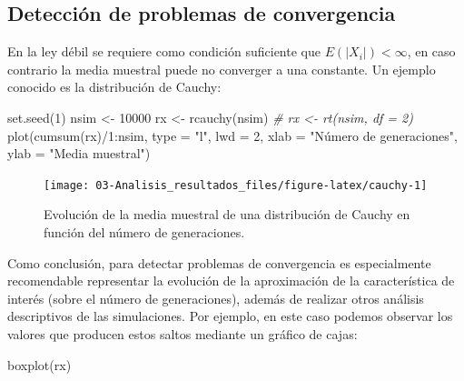 \documentclass[
]{book}
\newenvironment{Shaded}{\begin{snugshade}}{\end{snugshade}}
\newcommand{\AttributeTok}[1]{\textcolor[rgb]{0.77,0.63,0.00}{#1}}
\newcommand{\CommentTok}[1]{\textcolor[rgb]{0.56,0.35,0.01}{\textit{#1}}}
\newcommand{\DecValTok}[1]{\textcolor[rgb]{0.00,0.00,0.81}{#1}}
\newcommand{\FunctionTok}[1]{\textcolor[rgb]{0.00,0.00,0.00}{#1}}
\newcommand{\NormalTok}[1]{#1}
\newcommand{\OtherTok}[1]{\textcolor[rgb]{0.56,0.35,0.01}{#1}}
\newcommand{\SpecialCharTok}[1]{\textcolor[rgb]{0.00,0.00,0.00}{#1}}
\newcommand{\StringTok}[1]{\textcolor[rgb]{0.31,0.60,0.02}{#1}}
\theoremstyle{break}
\theoremstyle{nonumberplain}
\begin{document}
\hypertarget{detecciuxf3n-de-problemas-de-convergencia}{%
\subsection{Detección de problemas de convergencia}\label{detecciuxf3n-de-problemas-de-convergencia}}

En la ley débil se requiere como condición suficiente que \(E\left( \left\vert X_{i} \right\vert \right) < \infty\), en caso contrario la media muestral puede no converger a una constante.
Un ejemplo conocido es la distribución de Cauchy:

\begin{Shaded}
\begin{Highlighting}[]
\FunctionTok{set.seed}\NormalTok{(}\DecValTok{1}\NormalTok{)}
\NormalTok{nsim }\OtherTok{\textless{}{-}} \DecValTok{10000}
\NormalTok{rx }\OtherTok{\textless{}{-}} \FunctionTok{rcauchy}\NormalTok{(nsim) }\CommentTok{\# rx \textless{}{-} rt(nsim, df = 2)}
\FunctionTok{plot}\NormalTok{(}\FunctionTok{cumsum}\NormalTok{(rx)}\SpecialCharTok{/}\DecValTok{1}\SpecialCharTok{:}\NormalTok{nsim, }\AttributeTok{type =} \StringTok{"l"}\NormalTok{, }\AttributeTok{lwd =} \DecValTok{2}\NormalTok{, }
     \AttributeTok{xlab =} \StringTok{"Número de generaciones"}\NormalTok{, }\AttributeTok{ylab =} \StringTok{"Media muestral"}\NormalTok{)}
\end{Highlighting}
\end{Shaded}

\begin{figure}[!htb]

{\centering \texttt{[image: 03-Analisis\_resultados\_files/figure-latex/cauchy-1]} 

}

\caption{Evolución de la media muestral de una distribución de Cauchy en función del número de generaciones.}\label{fig:cauchy}
\end{figure}

Como conclusión, para detectar problemas de convergencia es especialmente recomendable representar la evolución de la aproximación de la característica de interés (sobre el número de generaciones),
además de realizar otros análisis descriptivos de las simulaciones.
Por ejemplo, en este caso podemos observar los valores que producen estos saltos mediante un gráfico de cajas:

\begin{Shaded}
\begin{Highlighting}[]
\FunctionTok{boxplot}\NormalTok{(rx)}
\end{Highlighting}
\end{Shaded}
\end{document}
